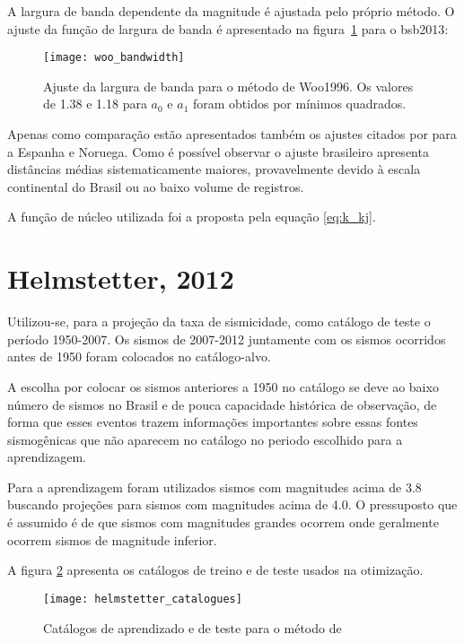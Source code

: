A largura de banda dependente da magnitude é ajustada pelo próprio método.
O ajuste da função de largura de banda é apresentado na figura~\ref{fig:woo_b} para o \gls{bsb2013}:

\begin{figure}[H]
  \centering
  \texttt{[image: woo\_bandwidth]} 
  \caption{Ajuste da largura de banda para o método de Woo1996.
  	Os valores de 1.38 e 1.18 para $a_0$ e $a_1$ foram obtidos por mínimos quadrados.}
  \label{fig:woo_b} 
\end{figure}

Apenas como comparação estão apresentados também os ajustes citados por \citet{beauval_2003} para a Espanha e Noruega.
Como é possível observar o ajuste brasileiro apresenta distâncias médias sistematicamente maiores, provavelmente
devido à escala continental do Brasil ou ao baixo volume de registros.

A função de núcleo utilizada foi a proposta pela equação \eqref{eq:k_kj}.

\section{Helmstetter, 2012}
\label{sec:proc_helmstetter}

Utilizou-se, para a projeção da taxa de sismicidade, como catálogo de teste
o período 1950-2007. Os sismos de 2007-2012 juntamente
com os sismos ocorridos antes de 1950 foram colocados no catálogo-alvo.

A escolha por colocar os sismos anteriores a 1950 no catálogo se deve ao baixo número
de sismos no Brasil e de pouca capacidade histórica de observação, de forma que esses eventos trazem informações
importantes sobre essas fontes sismogênicas que não aparecem no catálogo no periodo escolhido para a aprendizagem.

Para a aprendizagem foram utilizados sismos com magnitudes acima de 3.8 buscando projeções para
sismos com magnitudes acima de 4.0. O pressuposto que é assumido é de que sismos com magnitudes grandes
ocorrem onde geralmente ocorrem sismos de magnitude inferior.

A figura \ref{fig:h_catalogue} apresenta os catálogos de treino e de teste usados na otimização.

\begin{figure}[H]
  \centering
  \texttt{[image: helmstetter\_catalogues]} 
  \caption{Catálogos de aprendizado e de teste para o método de \citet{helmstetter_2012}}
  \label{fig:h_catalogue} 
\end{figure}

